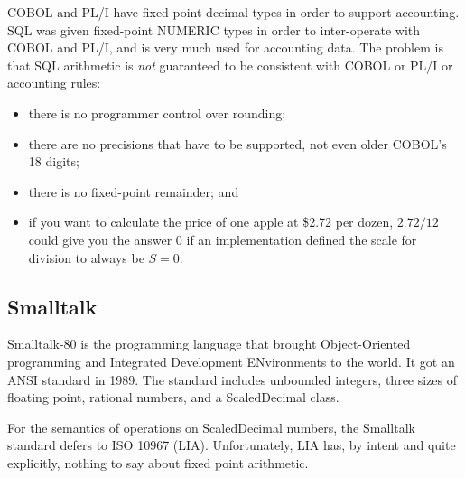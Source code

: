 \documentclass{article}
\begin{document}
COBOL and PL/I have fixed-point decimal types in order to support
accounting.
SQL was given fixed-point NUMERIC types in order to inter-operate
with COBOL and PL/I, and is very much used for accounting data.
The problem is that SQL arithmetic is {\it not} guaranteed
to be consistent with COBOL or PL/I or accounting rules:
\begin{itemize}
\item there is no programmer control over rounding;
\item there are no precisions that have to be supported,
not even older COBOL's 18 digits;
\item there is no fixed-point remainder; and
\item if you want to calculate the price of one
apple at \$2.72 per dozen, $2.72/12$ could give
you the answer 0 if an implementation defined the
scale for division to always be $S=0$.
\end{itemize}

\subsection{Smalltalk}

Smalltalk-80 is the programming language that brought Object-Oriented
programming and Integrated Development ENvironments to the world.
It got an ANSI standard in 1989.  The standard includes unbounded
integers, three sizes of floating point, rational numbers, and
a ScaledDecimal class.

For the semantics of operations on ScaledDecimal numbers,
the Smalltalk standard defers to ISO 10967 (LIA).  Unfortunately, LIA has,
by intent and quite explicitly, nothing to say about fixed point
arithmetic.
\end{document}

